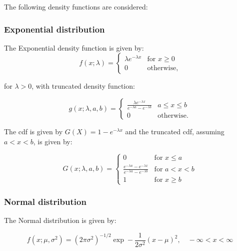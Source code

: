 \documentclass[review]{elsarticle}
\begin{document}
The following density functions are considered:

\subsubsection*{Exponential distribution}
The Exponential density function is given by: 
$$f(x; \lambda) = \left\{ \begin{array}{ll} \lambda e^{-\lambda x} & \text{for } x \ge 0 \\
0 & \text{otherwise},
\end{array}\right.
$$

for $\lambda >0$, with truncated density function:

$$ g(x; \lambda,a,b) = \left\{ \begin{array}{ll} \frac{\lambda e^{-\lambda x}}{e^{-\lambda a} - e^{-\lambda b}}& a \le x \le b \\
0 & \text{otherwise}.
\end{array}\right.
$$

The cdf is given by $G(X) = 1- e^{-\lambda x}$ and the truncated cdf, assuming $a<x<b$, is given by:

%
%

$$ G(x;\lambda,a,b) = \left\{ \begin{array}{ll} 0 & \text{for } x \le a \\
\frac{e^{-\lambda a} - e^{-\lambda x}}{e^{-\lambda a} - e^{-\lambda b}} & \text{for } a < x < b \\
1 & \text{for } x \ge b	
\end{array}
\right.
$$

\subsubsection*{Normal distribution} 

The Normal distribution is given by:

$$f(x; \mu,\sigma^2) = (2\pi \sigma^2)^{-1/2} \exp -\frac{1}{2\sigma^2} (x-\mu)^2,  \quad -\infty < x < \infty$$
\end{document}
